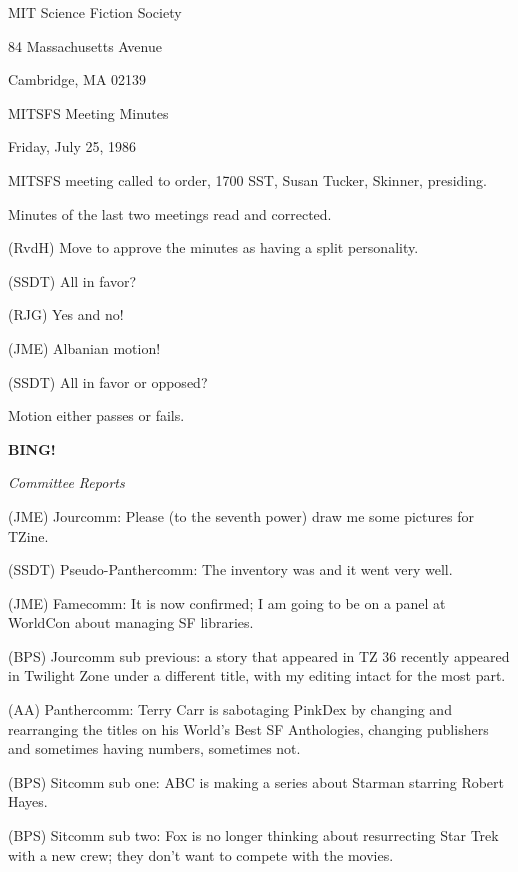 \documentclass[12pt]{article}
\newcommand{\bing}{{\bf BING!} }
\newcommand{\goto}[1]{\bing \vskip 12pt \centerline{{\em{#1}}}}
\begin{document}
\begin{center}

MIT Science Fiction Society 

84 Massachusetts Avenue

Cambridge, MA 02139

\vspace{12pt}

MITSFS Meeting Minutes 

Friday, July 25, 1986

\end{center}
 
\vspace{18pt}

\setlength{\parskip}{6pt}

\noindent
MITSFS meeting called to order, 1700 SST,
Susan Tucker, Skinner, presiding.

Minutes of the last two meetings read and corrected.

(RvdH) Move to approve the minutes as having a split personality.

(SSDT) All in favor?

(RJG) Yes and no!

(JME) Albanian motion!

(SSDT) All in favor or opposed?

Motion either passes or fails.

\goto{Committee Reports}

(JME) Jourcomm: Please (to the seventh power) draw me some pictures for TZine.

(SSDT) Pseudo-Panthercomm: The inventory was and it went very well.

(JME) Famecomm: It is now confirmed; I am going to be on a panel at WorldCon about managing SF libraries.

(BPS) Jourcomm sub previous: a story that appeared in TZ 36 recently appeared in Twilight Zone under a different title, with my editing intact for the most part.

(AA) Panthercomm: Terry Carr is sabotaging PinkDex by changing and rearranging the titles on his World's Best SF Anthologies, changing publishers and sometimes having numbers, sometimes not.

(BPS) Sitcomm sub one: ABC is making a series about Starman starring Robert Hayes.

(BPS) Sitcomm sub two: Fox is no longer thinking about resurrecting Star Trek with a new crew; they don't want to compete with the movies.
\end{document}
